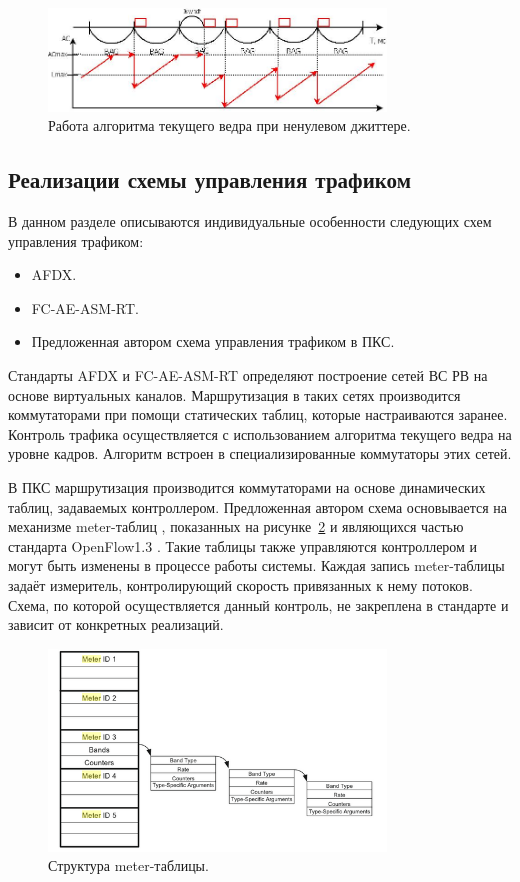 \documentclass[12pt, a4paper]{article}
\begin{document}
\begin{figure}[h!]
	\centering
	\includegraphics[width=0.80\textwidth]{img/jit.png}
	\caption{Работа алгоритма текущего ведра при ненулевом джиттере.}
	\label{pic:scheme:jit}
\end{figure}

\subsection{Реализации схемы управления трафиком}
В данном разделе описываются индивидуальные особенности следующих схем управления трафиком:
\begin{itemize}
	\item AFDX.
	\item FC-AE-ASM-RT.
	\item Предложенная автором схема управления трафиком в ПКС.
\end{itemize}

Стандарты AFDX и FC-AE-ASM-RT определяют построение сетей ВС РВ на основе виртуальных каналов. Маршрутизация в таких сетях производится коммутаторами при помощи статических таблиц, которые настраиваются заранее. Контроль трафика осуществляется с использованием алгоритма текущего ведра на уровне кадров. Алгоритм встроен в специализированные коммутаторы этих сетей.

В ПКС маршрутизация производится коммутаторами на основе динамических таблиц, задаваемых контроллером. Предложенная автором схема основывается на механизме meter-таблиц \cite{meter}, показанных на рисунке~\ref{pic:scheme:meter} и являющихся частью стандарта OpenFlow1.3 \cite{openflow}. Такие таблицы также управляются контроллером и могут быть изменены в процессе работы системы. Каждая запись meter-таблицы задаёт измеритель, контролирующий скорость привязанных к нему потоков. Схема, по которой осуществляется данный контроль, не закреплена в стандарте и зависит от конкретных реализаций. 

\begin{figure}[h!]
	\centering
	\includegraphics[width=0.80\textwidth]{img/meter.png}
	\caption{Структура meter-таблицы.}
	\label{pic:scheme:meter}
\end{figure}
\end{document}

